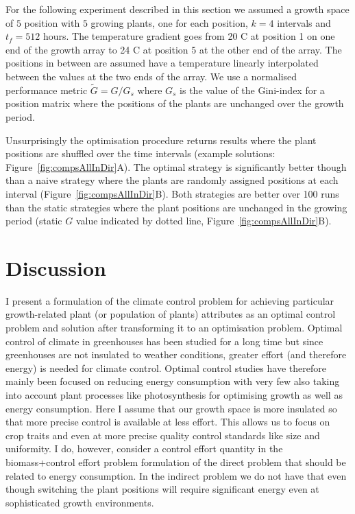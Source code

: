 For the following experiment described in this section we assumed a growth space
of $5$ position with $5$ growing plants, one for each position, $k=4$ intervals
and $t_f=512$ hours. The temperature gradient goes from 20 \textdegree C at
position 1 on one end of the growth array to 24 \textdegree C at position $5$ at
the other end of the array. The positions in between are assumed have a
temperature linearly interpolated between the values at the two ends of the
array. We use a normalised performance metric $\tilde{G}=G/G_s$ where $G_s$ is
the value of the Gini-index for a position matrix where the positions of the
plants are unchanged over the growth period.

Unsurprisingly the optimisation procedure returns results where the plant
positions are shuffled over the time intervals (example solutions:
Figure~\ref{fig:compsAllInDir}A). The optimal strategy is significantly better
though than a naive strategy where the plants are randomly assigned positions at
each interval (Figure~\ref{fig:compsAllInDir}B). Both strategies are better over
100 runs than the static strategies where the plant positions are unchanged in
the growing period (static $G$ value indicated by dotted line,
Figure~\ref{fig:compsAllInDir}B).


\section{Discussion}
I present a formulation of the climate control problem for achieving particular
growth-related plant (or population of plants) attributes as an optimal control
problem and solution after transforming it to an optimisation problem. Optimal
control of climate in greenhouses has been studied for a long time but since
greenhouses are not insulated to weather conditions, greater effort (and
therefore energy) is needed for climate control. Optimal control studies have
therefore mainly been focused on reducing energy consumption \citep{fisher1997,
ramirezArias2012, delSagrado2016} with very few also taking into account plant
processes like photosynthesis for optimising growth as well as energy
consumption\citep{harun2015, Aaslyng2003}. Here I assume that our growth space
is more insulated so that more precise control is available at less effort. This
allows us to focus on crop traits and even at more precise quality control
standards like size and uniformity. I do, however, consider a control effort
quantity in the biomass+control effort problem formulation of the direct problem
that should be related to energy consumption. In the indirect problem we do not
have that even though switching the plant positions will require significant
energy even at sophisticated growth environments.  %


